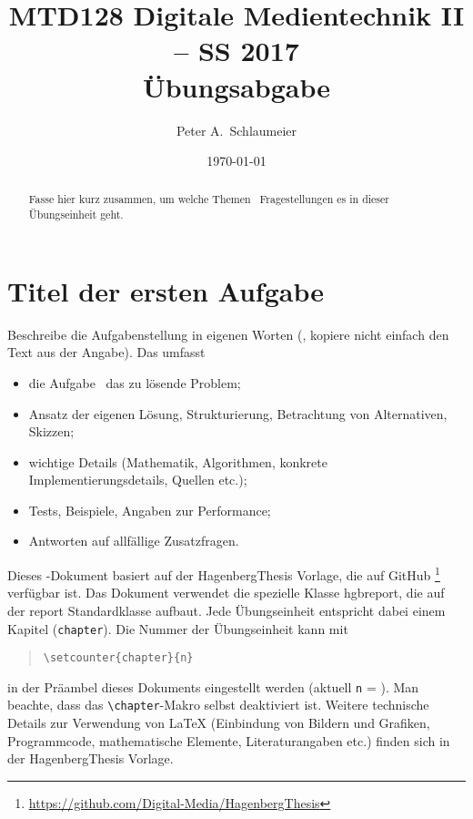 \documentclass[german,notitlepage]{hgbreport}
\author{Peter A.\ Schlaumeier}
\title{MTD128 Digitale Medientechnik II -- SS 2017\\
				Übungsabgabe \arabic{chapter}}
\date{\today}
\renewcommand{\chapter}[1]{}	%
\begin{document}
\maketitle

\begin{abstract}\noindent
Fasse hier kurz zusammen, um welche Themen \bzw\ Fragestellungen 
es in dieser Übungseinheit geht.
\end{abstract}


\section{Titel der ersten Aufgabe}

Beschreibe die Aufgabenstellung in eigenen Worten 
(\dah, kopiere nicht einfach den Text aus der Angabe).
Das umfasst \ia 
\begin{itemize}
\item
	die Aufgabe \bzw\ das zu lösende Problem;
\item
	Ansatz der eigenen Lösung, Strukturierung, Betrachtung von Alternativen, Skizzen;
\item
	wichtige Details (Mathematik, Algorithmen, konkrete Implementierungsdetails,
	Quellen \cite{Sedgewick2011} %
	etc.);
\item
	Tests, Beispiele, Angaben zur Performance;
\item
	Antworten auf allfällige Zusatzfragen.
\end{itemize}
%
Dieses \latex-Dokument basiert auf der \textsf{HagenbergThesis} 
Vorlage, die auf GitHub%
\footnote{\url{https://github.com/Digital-Media/HagenbergThesis}}
verfügbar ist.
Das Dokument verwendet die spezielle Klasse \textsf{hgbreport}, die auf der \textsf{report}
Standardklasse aufbaut. Jede Übungseinheit entspricht dabei einem Kapitel (\texttt{chapter}).
Die Nummer der Übungseinheit kann mit
\begin{quote}
\verb!\setcounter{chapter}{n}!
\end{quote}
in der Präambel dieses Dokuments eingestellt werden (aktuell \texttt{n} = ).
Man beachte, dass das \verb!\chapter!-Makro selbst deaktiviert ist.
Weitere technische Details zur Verwendung von LaTeX (Einbindung von Bildern und Grafiken,
Programmcode, mathematische Elemente, 
Literaturangaben etc.) finden sich in der \textsf{HagenbergThesis} Vorlage.
\end{document}
